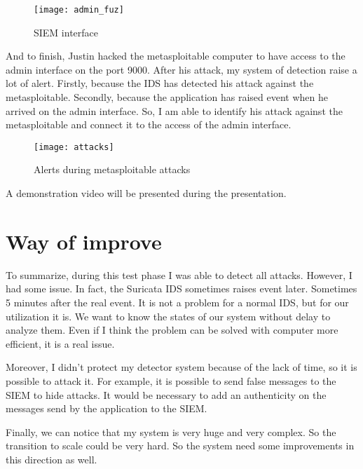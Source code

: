 \begin{figure}[h]
  \centering
  \texttt{[image: admin\_fuz]}
  \caption{SIEM interface}
  \label{fig:fuzz}
\end{figure}


And to finish, Justin hacked the metasploitable computer to have access to the admin interface on the port 9000.
After his attack, my system of detection raise a lot of alert. Firstly, because the IDS has detected his attack
against the metasploitable. Secondly, because the application has raised event when he arrived on the admin
interface. So, I am able to identify his attack against the metasploitable and connect it to the access of the
admin interface.


\begin{figure}[h]
  \centering
  \texttt{[image: attacks]}
  \caption{Alerts during metasploitable attacks}
  \label{fig:attcks}
\end{figure}

A demonstration video will be presented during the presentation.


\section{Way of improve}

To summarize, during this test phase I was able to detect all attacks. However, I had some issue. In fact, the
Suricata IDS sometimes raises event later. Sometimes 5 minutes after the real event. It is not a problem for a
normal IDS, but for our utilization it is. We want to know the states of our system without delay to analyze them.
Even if I think the problem can be solved with computer more efficient, it is a real issue.

Moreover, I didn't protect my detector system because of the lack of time, so it is possible to attack it. For
example, it is possible to send false messages to the SIEM to hide attacks. It would be necessary to add an
authenticity on the messages send by the application to the SIEM.

Finally, we can notice that my system is very huge and very complex. So the transition to scale could be very hard.
So the system need some improvements in this direction as well.




